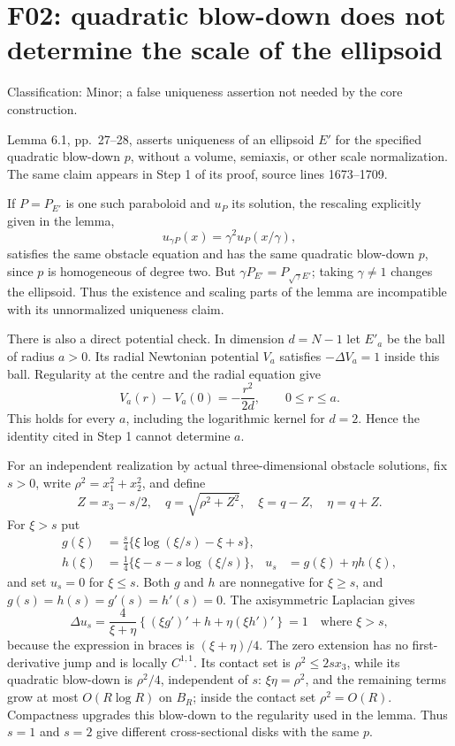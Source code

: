 \documentclass[10pt]{article}
\begin{document}
\section*{F02: quadratic blow-down does not determine the scale of the ellipsoid}
Classification: Minor; a false uniqueness assertion not needed by the core construction.\par
Lemma 6.1, pp. 27–28, asserts uniqueness of an ellipsoid \(E'\) for the specified quadratic blow-down \(p\), without a volume, semiaxis, or other scale normalization. The same claim appears in Step 1 of its proof, source lines 1673–1709.\par
If \(P=P_{E'}\) is one such paraboloid and \(u_P\) its solution, the rescaling explicitly given in the lemma, \[u_{\gamma P}(x)=\gamma^2u_P(x/\gamma),\] satisfies the same obstacle equation and has the same quadratic blow-down \(p\), since \(p\) is homogeneous of degree two. But \(\gamma P_{E'}=P_{\sqrt\gamma E'}\); taking \(\gamma\ne1\) changes the ellipsoid. Thus the existence and scaling parts of the lemma are incompatible with its unnormalized uniqueness claim.\par
There is also a direct potential check. In dimension \(d=N-1\) let \(E'_a\) be the ball of radius \(a>0\). Its radial Newtonian potential \(V_a\) satisfies \(-\Delta V_a=1\) inside this ball. Regularity at the centre and the radial equation give \[V_a(r)-V_a(0)=-\frac{r^2}{2d},\qquad 0\leq r\leq a.\] This holds for every \(a\), including the logarithmic kernel for \(d=2\). Hence the identity cited in Step 1 cannot determine \(a\).\par
For an independent realization by actual three-dimensional obstacle solutions, fix \(s>0\), write \(\rho^2=x_1^2+x_2^2\), and define \[Z=x_3-s/2,\quad
q=\sqrt{\rho^2+Z^2},\quad
\xi=q-Z,\quad \eta=q+Z.\] For \(\xi>s\) put \[\begin{aligned}
g(\xi)&=\frac{s}{4}\{\xi\log(\xi/s)-\xi+s\},\\
h(\xi)&=\frac14\{\xi-s-s\log(\xi/s)\},&
u_s&=g(\xi)+\eta h(\xi),\end{aligned}\] and set \(u_s=0\) for \(\xi\leq s\). Both \(g\) and \(h\) are nonnegative for \(\xi\geq s\), and \(g(s)=h(s)=g'(s)=h'(s)=0\). The axisymmetric Laplacian gives \[\Delta u_s=
\frac4{\xi+\eta}
 \left\{(\xi g')'+h+\eta(\xi h')'\right\}=1
 \quad\text{where }\xi>s,\] because the expression in braces is \((\xi+\eta)/4\). The zero extension has no first-derivative jump and is locally \(C^{1,1}\). Its contact set is \(\rho^2\leq2s x_3\), while its quadratic blow-down is \(\rho^2/4\), independent of \(s\): \(\xi\eta=\rho^2\), and the remaining terms grow at most \(O(R\log R)\) on \(B_R\); inside the contact set \(\rho^2=O(R)\). Compactness upgrades this blow-down to the regularity used in the lemma. Thus \(s=1\) and \(s=2\) give different cross-sectional disks with the same \(p\).\par
\end{document}
